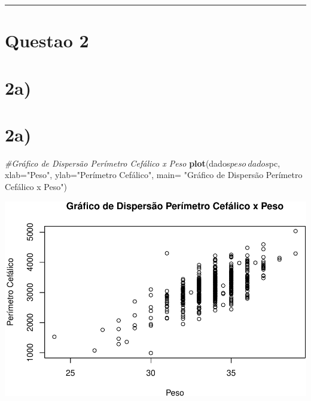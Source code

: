 \documentclass[11pt,]{article}
\makeatletter
\newenvironment{Shaded}{\begin{snugshade}}{\end{snugshade}}
\newcommand{\KeywordTok}[1]{\textcolor[rgb]{0.13,0.29,0.53}{\textbf{{#1}}}}
\newcommand{\DataTypeTok}[1]{\textcolor[rgb]{0.13,0.29,0.53}{{#1}}}
\newcommand{\StringTok}[1]{\textcolor[rgb]{0.31,0.60,0.02}{{#1}}}
\newcommand{\CommentTok}[1]{\textcolor[rgb]{0.56,0.35,0.01}{\textit{{#1}}}}
\newcommand{\NormalTok}[1]{{#1}}
\def\maxwidth{\ifdim\Gin@nat@width>\linewidth\linewidth
\else\Gin@nat@width\fi}
\let\Oldincludegraphics\includegraphics
\renewcommand{\includegraphics}[1]{\Oldincludegraphics[width=\maxwidth]{#1}}
\makeatother
\begin{document}
\begin{center}\rule{0.5\linewidth}{\linethickness}\end{center}

\section{Questao 2}\label{questao-2}

\section{2a)}\label{a-1}

\begin{Shaded}
\end{Shaded}

\section{2a)}\label{a-2}

\begin{Shaded}
\begin{Highlighting}[]
\CommentTok{#Gráfico de Dispersão Perímetro Cefálico x Peso}
\KeywordTok{plot}\NormalTok{(dados$peso~dados$pc, }\DataTypeTok{xlab=}\StringTok{"Peso"}\NormalTok{, }\DataTypeTok{ylab=}\StringTok{"Perímetro Cefálico"}\NormalTok{,}
     \DataTypeTok{main=} \StringTok{"Gráfico de Dispersão Perímetro Cefálico x Peso"}\NormalTok{)}
\end{Highlighting}
\end{Shaded}

\includegraphics{versaofinal_lista3_files/figure-latex/unnamed-chunk-8-1.pdf}
\end{document}
